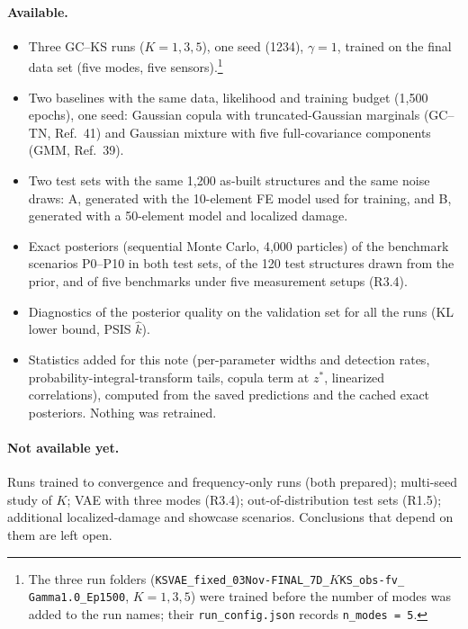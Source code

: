 \documentclass[11pt]{article}
\begin{document}
\paragraph{Available.}
\begin{itemize}
\item Three GC--KS runs ($K=1,3,5$), one seed (1234), $\gamma=1$, trained on the final data set (five modes, five
sensors).\footnote{The three run folders (\texttt{KSVAE\_fixed\_03Nov-FINAL\_7D\_}$K$\texttt{KS\_obs-fv\_\allowbreak
Gamma1.0\_Ep1500}, $K=1,3,5$) were trained before the number of modes was added to the run names; their
\texttt{run\_config.json} records \texttt{n\_modes = 5}.}
\item Two baselines with the same data, likelihood and training budget (1,500 epochs), one seed: Gaussian copula with
truncated-Gaussian marginals (GC--TN, Ref.~41) and Gaussian mixture with five full-covariance components (GMM, Ref.~39).
\item Two test sets with the same 1,200 as-built structures and the same noise draws: A, generated with the
10-element FE model used for training, and B, generated with a 50-element model and localized damage.
\item Exact posteriors (sequential Monte Carlo, 4,000 particles) of the benchmark scenarios P0--P10 in both test
sets, of the 120 test structures drawn from the prior, and of five benchmarks under five measurement setups (R3.4).
\item Diagnostics of the posterior quality on the validation set for all the runs (KL lower bound, PSIS $\hat k$).
\item Statistics added for this note (per-parameter widths and detection rates, probability-integral-transform
tails, copula term at $z^*$, linearized correlations), computed from the saved predictions and the cached exact
posteriors. Nothing was retrained.
\end{itemize}

\paragraph{Not available yet.} Runs trained to convergence and frequency-only runs (both prepared); multi-seed study of
$K$; VAE with three modes (R3.4); out-of-distribution test sets (R1.5); additional localized-damage and showcase
scenarios. Conclusions that depend on them are left open.

\end{document}
